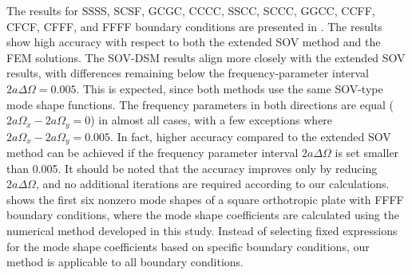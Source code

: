 \documentclass[preprint,12pt,number]{elsarticle}
\begin{document}
The results for SSSS, SCSF, GCGC, CCCC, SSCC, SCCC, GGCC, CCFF, CFCF, CFFF, and FFFF boundary conditions are presented in . 
The results show high accuracy with respect to both the extended SOV method and the FEM solutions. 
The SOV-DSM results align more closely with the extended SOV results, with differences remaining below the frequency-parameter interval $2a\Delta\Omega = 0.005$. 
This is expected, since both methods use the same SOV-type mode shape functions.
The frequency parameters in both directions are equal ($2a\Omega_x - 2a\Omega_y = 0$) in almost all cases, with a few exceptions where $2a\Omega_x - 2a\Omega_y = 0.005$. 
In fact, higher accuracy compared to the extended SOV method can be achieved if the frequency parameter interval $2a\Delta\Omega$ is set smaller than 0.005. It should be noted that the accuracy improves only by reducing $2a\Delta\Omega$, and no additional iterations are required according to our calculations.
 shows the first six nonzero mode shapes of a square orthotropic plate with FFFF boundary conditions, where the mode shape coefficients are calculated using the numerical method developed in this study. 
Instead of selecting fixed expressions for the mode shape coefficients based on specific boundary conditions, our method is applicable to all boundary conditions.
\end{document}
